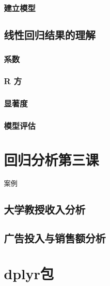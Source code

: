 \documentclass[]{book}
\begin{document}
\subsection{建立模型}

\section{线性回归结果的理解}

\subsection{系数}

\hypertarget{r-}{%
\subsection{R 方}\label{r-}}

\subsection{显著度}

\subsection{模型评估}

\chapter{回归分析第三课}

案例

\section{大学教授收入分析}

\section{广告投入与销售额分析}

\hypertarget{dplyr}{%
\chapter{dplyr包}\label{dplyr}}


\end{document}
